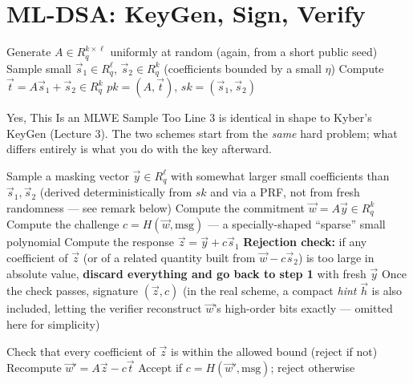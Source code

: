 \section{ML-DSA: KeyGen, Sign, Verify}
\label{sec:L4:ml-dsa-keygen-sign-verify}

\begin{algorithm}[ht]
\caption{ML-DSA.KeyGen}
\begin{algorithmic}[1]
\State Generate $A \in R_q^{k\times \ell}$ uniformly at random (again, from a short public seed)
\State Sample small $\vec s_1 \in R_q^\ell$, $\vec s_2 \in R_q^k$ (coefficients bounded by a small $\eta$)
\State Compute $\vec t = A\vec s_1 + \vec s_2 \in R_q^k$
\State \Return $pk = (A, \vec t)$, $sk = (\vec s_1, \vec s_2)$
\end{algorithmic}
\end{algorithm}

\begin{rmkbox}{Yes, This Is an MLWE Sample Too}
Line 3 is identical in shape to Kyber's KeyGen (Lecture 3). The two schemes start from the \emph{same} hard problem; what differs entirely is what you do with the key afterward.
\end{rmkbox}

\begin{algorithm}[ht]
\caption{ML-DSA.Sign$(sk = (\vec s_1,\vec s_2),\ \text{msg})$ --- Simplified}
\begin{algorithmic}[1]
\State Sample a masking vector $\vec y \in R_q^\ell$ with somewhat larger small coefficients than $\vec s_1,\vec s_2$ (derived deterministically from $sk$ and  via a PRF, not from fresh randomness --- see remark below)
\State Compute the commitment $\vec w = A\vec y \in R_q^k$
\State Compute the challenge $c = H(\vec w, \text{msg})$ --- a specially-shaped ``sparse'' small polynomial
\State Compute the response $\vec z = \vec y + c\vec s_1$
\State \textbf{Rejection check:} if any coefficient of $\vec z$ (or of a related quantity built from $\vec w - c\vec s_2$) is too large in absolute value, \textbf{discard everything and go back to step 1} with fresh $\vec y$
\State Once the check passes, \Return signature $(\vec z, c)$ (in the real scheme, a compact \emph{hint} $\vec h$ is also included, letting the verifier reconstruct $\vec w$'s high-order bits exactly --- omitted here for simplicity)
\end{algorithmic}
\end{algorithm}

\begin{algorithm}[ht]
\caption{ML-DSA.Verify$(pk=(A,\vec t),\ \text{msg},\ (\vec z, c))$ --- Simplified}
\begin{algorithmic}[1]
\State Check that every coefficient of $\vec z$ is within the allowed bound (reject if not)
\State Recompute $\vec w' = A\vec z - c\vec t$
\State Accept if $c = H(\vec w', \text{msg})$; reject otherwise
\end{algorithmic}
\end{algorithm}

